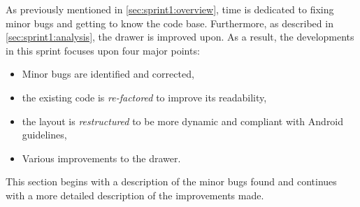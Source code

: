 As previously mentioned in \cref{sec:sprint1:overview}, time is dedicated to fixing minor bugs and getting to know the code base.
Furthermore, as described in \cref{sec:sprint1:analysis}, the drawer is improved upon.
As a result, the developments in this sprint focuses upon four major points:

\begin{itemize}
\item Minor bugs are identified and corrected,
\item the existing code is \textit{re-factored} to improve its readability,
\item the layout is \textit{restructured} to be more dynamic and compliant with Android guidelines,
\item Various improvements to the drawer.
\end{itemize}

This section begins with a description of the minor bugs found and continues with a more detailed description of the improvements made.